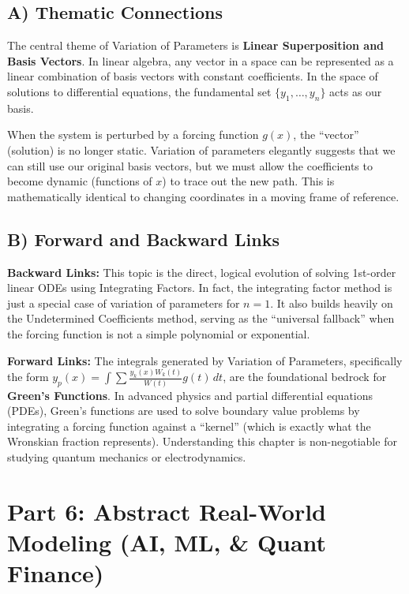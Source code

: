 \documentclass[12pt]{article}
\begin{document}
\subsection{A) Thematic Connections}
The central theme of Variation of Parameters is \textbf{Linear Superposition and Basis Vectors}. In linear algebra, any vector in a space can be represented as a linear combination of basis vectors with constant coefficients. In the space of solutions to differential equations, the fundamental set $\{y_1, \dots, y_n\}$ acts as our basis. 

When the system is perturbed by a forcing function $g(x)$, the ``vector'' (solution) is no longer static. Variation of parameters elegantly suggests that we can still use our original basis vectors, but we must allow the coefficients to become dynamic (functions of $x$) to trace out the new path. This is mathematically identical to changing coordinates in a moving frame of reference.

\subsection{B) Forward and Backward Links}
\textbf{Backward Links:} This topic is the direct, logical evolution of solving 1st-order linear ODEs using Integrating Factors. In fact, the integrating factor method is just a special case of variation of parameters for $n=1$. It also builds heavily on the Undetermined Coefficients method, serving as the ``universal fallback'' when the forcing function is not a simple polynomial or exponential.

\textbf{Forward Links:} The integrals generated by Variation of Parameters, specifically the form $y_p(x) = \int \sum \frac{y_k(x) W_k(t)}{W(t)} g(t) \, dt$, are the foundational bedrock for \textbf{Green's Functions}. In advanced physics and partial differential equations (PDEs), Green's functions are used to solve boundary value problems by integrating a forcing function against a ``kernel'' (which is exactly what the Wronskian fraction represents). Understanding this chapter is non-negotiable for studying quantum mechanics or electrodynamics.

\newpage
\section{Part 6: Abstract Real-World Modeling (AI, ML, \& Quant Finance)}
\end{document}
